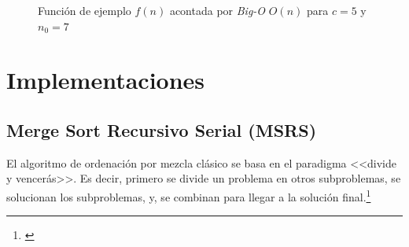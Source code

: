 \documentclass[titlepage]{article}
\begin{document}

\begin{figure}[h]
	\captionsetup{justification=centering}
	\centering
	
	\caption{Función de ejemplo \(f(n)\) acontada por \textit{Big-O} \(O(n)\) para \(c=5\) y \(n_0=7\)}
	\label{fig:bigO}
\end{figure}

\newpage
\section{Implementaciones} %

\subsection{Merge Sort Recursivo Serial (MSRS)} %
El algoritmo de ordenación por mezcla clásico se basa en el paradigma <<divide y vencerás>>. Es decir, primero se divide un problema en otros subproblemas, se solucionan los subproblemas, y, se combinan para llegar a la solución
final.\footnote{\cite{Sedgewick2003-cd}}
\end{document}
